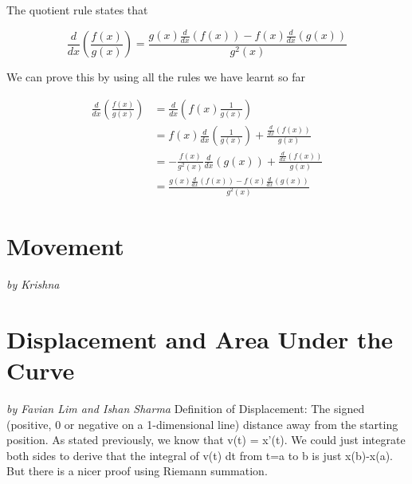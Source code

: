 \documentclass[a4paper,12pt,oneside]{book}
\begin{document}
The quotient rule states that

$$\frac{d}{dx}\left(\frac{f(x)}{g(x)}\right) = \frac{g(x)\frac{d}{dx}(f(x))-f(x)\frac{d}{dx}(g(x))}{g^2(x)}$$

\noindent We can prove this by using all the rules we have learnt so far

$$\begin{aligned}
\frac{d}{dx}\left(\frac{f(x)}{g(x)}\right)&=\frac{d}{dx}\left(f(x)\frac{1}{g(x)}\right)\\
&=f(x)\frac{d}{dx}\left(\frac{1}{g(x)}\right)+\frac{\frac{d}{dx}(f(x))}{g(x)}\\
&=-\frac{f(x)}{g^2(x)}\frac{d}{dx}(g(x))+\frac{\frac{d}{dx}(f(x))}{g(x)}\\
&=\frac{g(x)\frac{d}{dx}(f(x))-f(x)\frac{d}{dx}(g(x))}{g^2(x)}
\end{aligned}$$


\newpage
\chapter{Movement}
\vspace{-30pt}
\large \textit{by Krishna}


\newpage
\chapter{Displacement and Area Under the Curve}
\vspace{-30pt}
\large \textit{by Favian Lim and Ishan Sharma}
\newline \newline Definition of Displacement: The signed (positive, 0 or negative on a 1-dimensional line) distance away from the starting position.
\newline As stated previously, we know that v(t) = x'(t).
We could just integrate both sides to derive that the integral of v(t) dt from t=a to b is just x(b)-x(a).
\newline
\newline But there is a nicer proof using Riemann summation.
\end{document}
